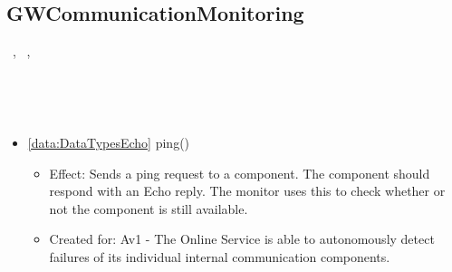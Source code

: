   \subsection{GWCommunicationMonitoring}\label{int:OnlineServiceOnlineServiceGatewayCommunicationHandlerGWCommunicationMonitoring}
    \begin{description}
      \item[Provided by:] \iconcomponent{}~, \iconcomponent{}~, \iconcomponent{}~
      \item[Required by:] \iconcomponent{}~
      \item[Operations:] ~
    \begin{itemize}[noitemsep,nolistsep,leftmargin=-.25cm]
      \item \textsf{\ref{data:DataTypesEcho} ping()}
        \begin{itemize}[noitemsep,nolistsep]
           \item Effect: Sends a ping request to a component. The component should respond with an Echo reply. The monitor uses this to check whether or not the component is still available.
\item Created for: Av1 - The Online Service is able to autonomously detect failures of its individual internal communication components.
        \end{itemize}
    \end{itemize}
    \end{description}

